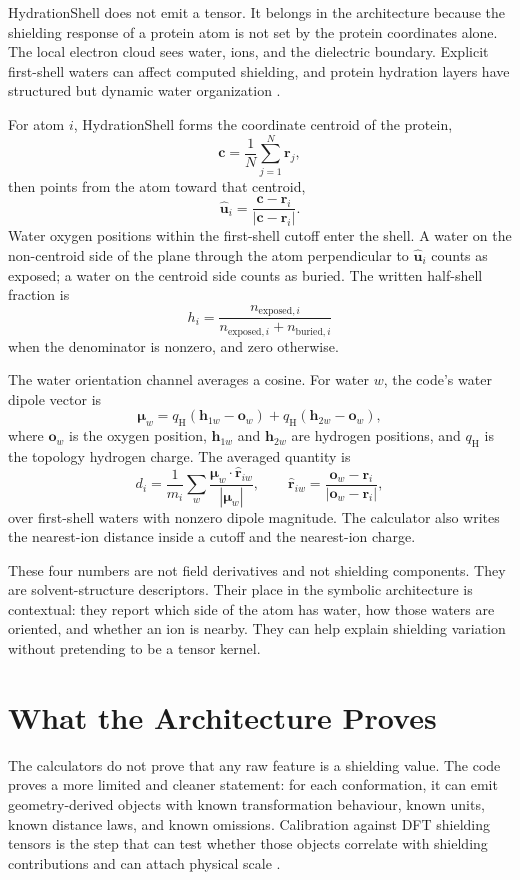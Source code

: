 \documentclass[11pt]{article}
\begin{document}
HydrationShell does not emit a tensor. It belongs in the architecture because
the shielding response of a protein atom is not set by the protein coordinates
alone. The local electron cloud sees water, ions, and the dielectric boundary.
Explicit first-shell waters can affect computed shielding, and protein
hydration layers have structured but dynamic water organization
\cite{nakasako2004,halle2004,martin2015}.

For atom \(i\), HydrationShell forms the coordinate centroid of the protein,
\[
  \bm c=\frac{1}{N}\sum_{j=1}^N \bm r_j,
\]
then points from the atom toward that centroid,
\[
  \hat{\bm u}_i=\frac{\bm c-\bm r_i}{|\bm c-\bm r_i|}.
\]
Water oxygen positions within the first-shell cutoff enter the shell. A water
on the non-centroid side of the plane through the atom perpendicular to
\(\hat{\bm u}_i\) counts as exposed; a water on the centroid side counts as
buried. The written half-shell fraction is
\[
  h_i=
  \frac{n_{\mathrm{exposed},i}}
       {n_{\mathrm{exposed},i}+n_{\mathrm{buried},i}}
\]
when the denominator is nonzero, and zero otherwise.

The water orientation channel averages a cosine. For water \(w\), the code's
water dipole vector is
\[
  \bm\mu_w
  =
  q_{\mathrm H}(\bm h_{1w}-\bm o_w)
  +
  q_{\mathrm H}(\bm h_{2w}-\bm o_w),
\]
where \(\bm o_w\) is the oxygen position, \(\bm h_{1w}\) and \(\bm h_{2w}\)
are hydrogen positions, and \(q_{\mathrm H}\) is the topology hydrogen charge.
The averaged quantity is
\[
  d_i=
  \frac{1}{m_i}
  \sum_w
  \frac{\bm\mu_w\cdot\hat{\bm r}_{iw}}{|\bm\mu_w|},
  \qquad
  \hat{\bm r}_{iw}
  =
  \frac{\bm o_w-\bm r_i}{|\bm o_w-\bm r_i|},
\]
over first-shell waters with nonzero dipole magnitude. The calculator also
writes the nearest-ion distance inside a cutoff and the nearest-ion charge.

These four numbers are not field derivatives and not shielding components. They
are solvent-structure descriptors. Their place in the symbolic architecture is
contextual: they report which side of the atom has water, how those waters are
oriented, and whether an ion is nearby. They can help explain shielding
variation without pretending to be a tensor kernel.

\section{What the Architecture Proves}

The calculators do not prove that any raw feature is a shielding value. The
code proves a more limited and cleaner statement: for each conformation, it can
emit geometry-derived objects with known transformation behaviour, known units,
known distance laws, and known omissions. Calibration against DFT shielding
tensors is the step that can test whether those objects correlate with
shielding contributions and can attach physical scale \cite{dedios1993}.
\end{document}
